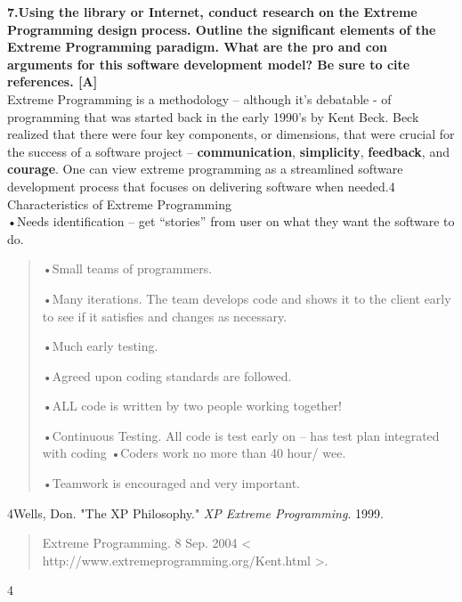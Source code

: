 \documentclass[
]{article}
\begin{document}
\textbf{7.Using the library or Internet, conduct research on the Extreme
Programming design} \textbf{process. Outline the significant elements of
the Extreme Programming paradigm. What} \textbf{are the pro and con
arguments for this software development model? Be sure to cite}
\textbf{references. {[}A{]}}\\
Extreme Programming is a methodology -- although it's debatable - of
programming that was started back in the early 1990's by Kent Beck. Beck
realized that there were four key components, or dimensions, that were
crucial for the success of a software project -- \textbf{communication},
\textbf{simplicity}, \textbf{feedback}, and \textbf{courage}. One can
view extreme programming as a streamlined software development process
that focuses on delivering software when needed.4\\
Characteristics of Extreme Programming\\
•Needs identification -- get ``stories'' from user on what they want the
software to do.

\begin{quote}
•Small teams of programmers.

•Many iterations. The team develops code and shows it to the client
early to see if it satisfies and changes as necessary.

•Much early testing.

•Agreed upon coding standards are followed.

•ALL code is written by two people working together!

•Continuous Testing. All code is test early on -- has test plan
integrated with coding •Coders work no more than 40 hour/ wee.

•Teamwork is encouraged and very important.
\end{quote}

4Wells, Don. "The XP Philosophy." \emph{XP Extreme Programming}. 1999.

\begin{quote}
Extreme Programming. 8 Sep. 2004 \textless{}
http://www.extremeprogramming.org/Kent.html \textgreater.
\end{quote}

4
\end{document}
